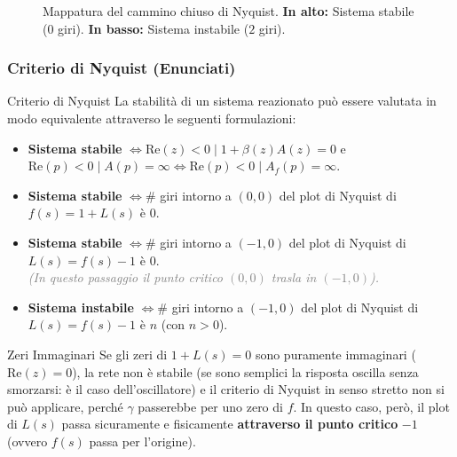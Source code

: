 \begin{figure}[H]
\caption{Mappatura del cammino chiuso di Nyquist. \textbf{In alto:} Sistema stabile ($0$ giri). \textbf{In basso:} Sistema instabile ($2$ giri).}
\label{fig:nyquist_mapping}
\end{figure}

\subsubsection{Criterio di Nyquist (Enunciati)}

\begin{teorema}{Criterio di Nyquist}
La stabilità di un sistema reazionato può essere valutata in modo equivalente attraverso le seguenti formulazioni:
\begin{itemize}[itemsep=1.5ex]
    \item \textbf{Sistema stabile} $\iff \text{Re}(z) < 0 \mid 1+\beta(z)A(z)=0$ e $\text{Re}(p) < 0 \mid A(p)=\infty \iff \text{Re}(p) < 0 \mid A_f(p)=\infty$.
    
    \item \textbf{Sistema stabile} $\iff \#$ giri intorno a $(0,0)$ del plot di Nyquist di $f(s)=1+L(s)$ è $0$. 
    
    \item \textbf{Sistema stabile} $\iff \#$ giri intorno a $(-1,0)$ del plot di Nyquist di $L(s)=f(s)-1$ è $0$. \\
    \textcolor{gray}{\small \textit{(In questo passaggio il punto critico $(0,0)$ trasla in $(-1,0)$).}}
    
    \item \textbf{Sistema instabile} $\iff \#$ giri intorno a $(-1,0)$ del plot di Nyquist di $L(s)=f(s)-1$ è $n$ (con $n>0$).
\end{itemize}
\end{teorema}

\begin{osservazione}{Zeri Immaginari}
Se gli zeri di $1+L(s)=0$ sono puramente immaginari ($\text{Re}(z)=0$), la rete non è stabile (se sono semplici la risposta oscilla senza smorzarsi: è il caso dell'oscillatore) e il criterio di Nyquist in senso stretto non si può applicare, perché $\gamma$ passerebbe per uno zero di $f$. In questo caso, però, il plot di $L(s)$ passa sicuramente e fisicamente \textbf{attraverso il punto critico} $-1$ (ovvero $f(s)$ passa per l'origine).
\end{osservazione}


